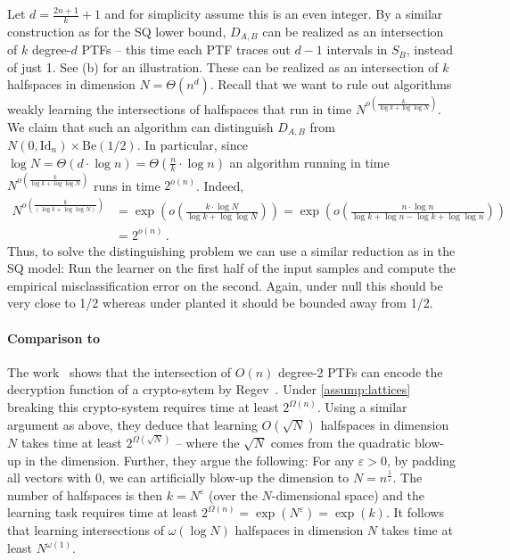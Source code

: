 \documentclass{theoretics}
\newcommand{\Paren}[1]{\left(#1\right)}
\let\epsilon=\varepsilon
\newcommand{\e}{\epsilon}
\newcommand*{\Id}{\mathrm{Id}}
\newcommand{\Be}[1]{\mathrm{Be}(#1)}
\begin{document}
Let $d = \tfrac {2n+1} k + 1$ and for simplicity assume this is an even integer.
By a similar construction as for the SQ lower bound, $D_{A,B}$ can be realized as an intersection of $k$ degree-$d$ PTFs -- this time each PTF traces out $d-1$ intervals in $S_B$, instead of just 1.
See (b) for an illustration. %
These can be realized as an intersection of $k$ halfspaces in dimension $N = \Theta(n^d)$.
Recall that we want to rule out algorithms weakly learning the intersections of halfspaces that run in time $N^{o(\tfrac k {\log k +\log \log N})}$.
We claim that such an algorithm can distinguish $D_{A,B}$ from $N(0,\Id_n)\times \Be{1/2}$.
In particular, since $\log N = \Theta(d \cdot \log n) = \Theta(\tfrac n k \cdot \log n)$ an algorithm running in time $N^{o(\tfrac k {\log k +\log \log N})}$ runs in time $2^{o(n)}$.
Indeed,
\begin{align*}
    N^{o\Paren{\tfrac{k}{\Paren{\log k + \log\log N}}}} &= \exp\Paren{o\Paren{\frac {k \cdot \log N}{\log k + \log\log N}}} = \exp\Paren{o\Paren{\frac {n \cdot \log n}{\log k + \log n - \log k + \log\log n}}} \\
        &=2^{o\Paren{n}}\,.
\end{align*}
Thus, to solve the distinguishing problem we can use a similar reduction as in the SQ model:
Run the learner on the first half of the input samples and compute the empirical misclassification error on the second.
Again, under null this should be very close to 1/2 whereas under planted it should be bounded away from 1/2.

\paragraph{Comparison to~\cite{klivans2009cryptographic}}

The work~\cite{klivans2009cryptographic} shows that the intersection of $O(n)$ degree-2 PTFs can encode the decryption function of a crypto-sytem by Regev~\cite{DBLP:journals/jacm/Regev09}.
Under \cref{assump:lattices} breaking this crypto-system requires time at least $2^{\Omega(n)}$.
Using a similar argument as above, they deduce that learning $O(\sqrt{N})$ halfspaces in dimension $N$ takes time at least $2^{\Omega(\sqrt{N})}$ -- where the $\sqrt{N}$ comes from the quadratic blow-up in the dimension.
Further, they argue the following: For any $\e > 0$, by padding all vectors with 0, we can artificially blow-up the dimension to $N = n^{\tfrac 1 \e}$.
The number of halfspaces is then $k = N^\e$ (over the $N$-dimensional space) and the learning task requires time at least $2^{\Omega(n)} = \exp(N^\e) = \exp(k)$.
It follows that learning intersections of $\omega(\log N)$ halfspaces in dimension $N$ takes time at least $N^{\omega(1)}$.
\end{document}
